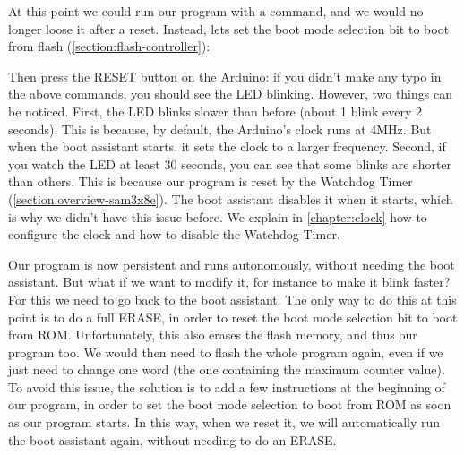 At this point we could run our program with a  command, and we
would no longer loose it after a reset. Instead, lets set the boot mode
selection bit to boot from flash (\cf \cref{section:flash-controller}):


\noindent Then press the RESET button on the Arduino: if you didn't make any
typo in the above commands, you should see the LED blinking. However, two
things can be noticed. First, the LED blinks slower than before (about 1 blink
every 2 seconds). This is because, by default, the Arduino's clock runs at
4MHz. But when the boot assistant starts, it sets the clock to a larger
frequency. Second, if you watch the LED at least 30 seconds, you can see that
some blinks are shorter than others. This is because our program is reset by
the Watchdog Timer (\cf \cref{section:overview-sam3x8e}). The boot assistant
disables it when it starts, which is why we didn't have this issue before. We
explain in \cref{chapter:clock} how to configure the clock and how to disable
the Watchdog Timer.

Our program is now persistent and runs autonomously, without needing the boot
assistant. But what if we want to modify it, for instance to make it blink
faster? For this we need to go back to the boot assistant. The only way to do
this at this point is to do a full ERASE, in order to reset the boot mode
selection bit to boot from ROM. Unfortunately, this also erases the flash
memory, and thus our program too. We would then need to flash the whole program
again, even if we just need to change one word (the one containing the maximum
counter value). To avoid this issue, the solution is to add a few instructions
at the beginning of our program, in order to set the boot mode selection to boot
from ROM as soon as our program starts. In this way, when we reset it, we will
automatically run the boot assistant again, without needing to do an ERASE.

